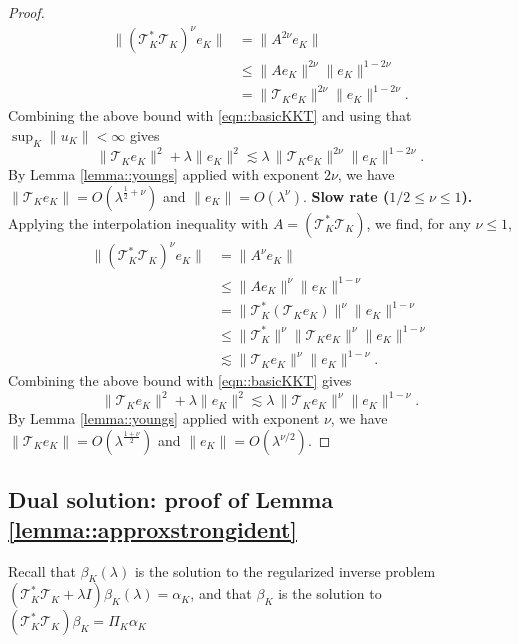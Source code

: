 \documentclass[11pt]{article}
\theoremstyle{plain}
\theoremstyle{definition}
\theoremstyle{remark}
\theoremstyle{definition}
\begin{document}
\begin{proof}
\begin{align*}
\|(\mathcal{T}_K^* \mathcal{T}_K)^{\nu} e_K\| 
&= \|A^{2\nu} e_K\| \\
&\le \|A e_K\|^{2\nu} \|e_K\|^{1-2\nu} \\
&= \|\mathcal{T}_K e_K\|^{2\nu} \|e_K\|^{1-2\nu}.
\end{align*}
Combining the above bound with \eqref{eqn::basicKKT} and using that $\sup_K  \|   u_K \| < \infty$ gives
\[
\|\mathcal{T}_K e_K\|^2 + \lambda \|e_K\|^2 
\lesssim  \lambda\,   \|\mathcal{T}_K e_K\|^{2\nu} \|e_K\|^{1 - 2\nu}.
\]
By Lemma  \ref{lemma::youngs} applied with exponent $2\nu$, we have $\|\mathcal{T}_K e_K\| = O(\lambda^{\frac{1}{2} + \nu})$ and $\|e_K\| = O(\lambda^{\nu})$. 
\newline \textbf{Slow rate ($1/2 \leq \nu \leq 1$).} Applying the interpolation inequality with $A = (\mathcal{T}_K^* \mathcal{T}_K) $, we find, for any $\nu \leq 1$,
\begin{align*}
\|(\mathcal{T}_K^* \mathcal{T}_K)^{\nu} e_K\| 
&= \|A^{\nu} e_K\| \\
&\le \|A e_K\|^{\nu} \|e_K\|^{1-\nu} \\
&= \|\mathcal{T}_K^*(\mathcal{T}_K e_K)\|^{\nu} \|e_K\|^{1-\nu} \\
&\le \|\mathcal{T}_K^*\|^{\nu} \|\mathcal{T}_K e_K\|^{\nu} \|e_K\|^{1-\nu}\\
&\lesssim \|\mathcal{T}_K e_K\|^{\nu} \|e_K\|^{1-\nu}.
\end{align*}
Combining the above bound with \eqref{eqn::basicKKT}  gives
\[
\|\mathcal{T}_K e_K\|^2 + \lambda \|e_K\|^2 
\lesssim  \lambda\,   \|\mathcal{T}_K e_K\|^{\nu} \|e_K\|^{1-\nu}.
\]
By Lemma  \ref{lemma::youngs} applied with exponent $\nu$, we have $\|\mathcal{T}_K e_K\| = O(\lambda^{\frac{1 + \nu}{2} })$ and $\|e_K\| = O(\lambda^{\nu/2})$. 
 


\end{proof}

\subsection{Dual solution: proof of Lemma \ref{lemma::approxstrongident}}
 

  Recall that \( \beta_{K}(\lambda) \) is the solution to the regularized inverse problem \( (\mathcal{T}_{K}^* \mathcal{T}_{K} + \lambda I) \beta_{K}(\lambda) = \alpha_K \), and that $\beta_K$ is the solution to \( (\mathcal{T}_{K}^* \mathcal{T}_{K} ) \beta_{K}  = \Pi_K \alpha_K \) 
 
\end{document}

